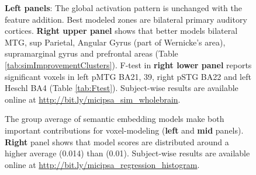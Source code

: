 \begin{figure}
    \centering
    \caption[Encoding with  Features, Group]{\textbf{Left panels}: The global activation pattern is unchanged with the feature addition. Best modeled zones are bilateral primary auditory cortices. \textbf{Right upper panel}  shows that  better models bilateral MTG, sup Parietal, Angular Gyrus (part of Wernicke's area), supramarginal gyrus and prefrontal areas (Table \ref{tab:simImprovementClusters}). F-test in \textbf{right lower panel} reports significant voxels in left pMTG BA21, 39, right pSTG BA22 and left Heschl BA4 (Table \ref{tab:Ftest}). Subject-wise results are available online at \url{http://bit.ly/micipsa_sim_wholebrain}.} 
    \label{fig:SIM_ContrastMapG}
\end{figure}

\begin{figure}
    \centering
    \caption[Histogram of  with  Features]{The group average of semantic embedding models make both important contributions for voxel-modeling (\textbf{left} and \textbf{mid} panels). \textbf{Right} panel shows that  model scores are distributed around a higher average (0.014) than  (0.01). Subject-wise results are available online at \url{http://bit.ly/micipsa_regression_histogram}.} 
    \label{fig:SIM_ASN_Distribution}
\end{figure}

